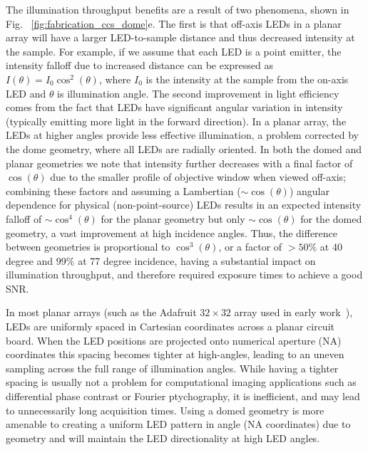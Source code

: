 The illumination throughput benefits are a result of two phenomena, shown in Fig. ~\ref{fig:fabrication_ccs_dome}e. The first is that off-axis LEDs in a planar array will have a larger LED-to-sample distance and thus decreased intensity at the sample. For example, if we assume that each LED is a point emitter, the intensity falloff due to increased distance can be expressed as $I(\theta) = I_0 \cos^2(\theta)$, where $I_0$ is the intensity at the sample from the on-axis LED and $\theta$ is illumination angle. The second improvement in light efficiency comes from the fact that LEDs have significant angular variation in intensity (typically emitting more light in the forward direction). In a planar array, the LEDs at higher angles provide less effective illumination, a problem corrected by the dome geometry, where all LEDs are radially oriented. In both the domed and planar geometries we note that intensity further decreases with a final factor of $\cos(\theta)$ due to the smaller profile of objective window when viewed off-axis; combining these factors and assuming a Lambertian ($\sim\cos(\theta)$) angular dependence for physical (non-point-source) LEDs results in an expected intensity falloff of $\sim\cos^4(\theta)$ for the planar geometry but only $\sim\cos(\theta)$ for the domed geometry, a vast improvement at high incidence angles. Thus, the difference between geometries is proportional to $\cos^{3}(\theta)$, or a factor of $> 50 \%$ at 40 degree and $99\%$ at 77 degree incidence, having a substantial impact on illumination throughput, and therefore required exposure times to achieve a good SNR.

In most planar arrays (such as the Adafruit $32 \times 32$ array used in early work~\cite{Zheng2013, Zheng2011}), LEDs are uniformly spaced in Cartesian coordinates across a planar circuit board. When the LED positions are projected onto numerical aperture (NA) coordinates this spacing becomes tighter at high-angles, leading to an uneven sampling across the full range of illumination angles. While having a tighter spacing is usually not a problem for computational imaging applications such as differential phase contrast or Fourier ptychography, it is inefficient, and may lead to unnecessarily long acquisition times. Using a domed geometry is more amenable to creating a uniform LED pattern in angle (NA coordinates) due to geometry and will maintain the LED directionality at high LED angles.

